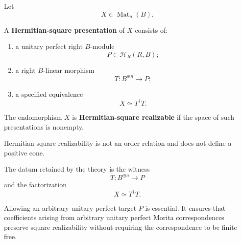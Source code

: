 \begin{definition}
\label{def:higher-hermitian-square-presentation}
Let
\[
  X\in\operatorname{Mat}_n(B).
\]

A \textbf{Hermitian-square presentation} of \(X\) consists of:

\begin{enumerate}
  \item a unitary perfect right \(B\)-module
  \[
    P\in\mathcal H_R(R,B);
  \]

  \item a right \(B\)-linear morphism
  \[
    T:B^{\oplus n}\to P;
  \]

  \item a specified equivalence
  \[
    X\simeq T^\dagger T.
  \]
\end{enumerate}

The endomorphism \(X\) is \textbf{Hermitian-square realizable} if the space of
such presentations is nonempty.
\end{definition}

\begin{remark}
\label{rem:higher-witnessed-positivity}
Hermitian-square realizability is not an order relation and does not define a
positive cone.

The datum retained by the theory is the witness
\[
  T:B^{\oplus n}\to P
\]
and the factorization
\[
  X\simeq T^\dagger T.
\]

Allowing an arbitrary unitary perfect target \(P\) is essential. It ensures
that coefficients arising from arbitrary unitary perfect Morita
correspondences preserve square realizability without requiring the
correspondence to be finite free.
\end{remark}

